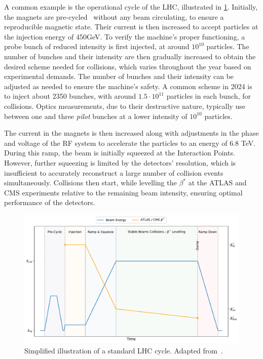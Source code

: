A common example is the operational cycle of the LHC, illustrated in \cref{fig:cern_complex:cycle}.
Initially, the magnets are pre-cycled~\cite{bottura_pre-cycles_2010} without any beam circulating,
to ensure a reproducible magnetic state. Their current is then increased to accept particles at the
injection energy of 450GeV. To verify the machine's proper functioning, a probe bunch of reduced
intensity is first injected, at around $10^{10}$ particles. The number of bunches and their
intensity are then gradually increased to obtain the desired scheme needed for collisions, which
varies throughout the year based on experimental demands. The number of bunches and their intensity
can be adjusted as needed to ensure the machine's safety. A common scheme in 2024 is to inject about
2350 bunches, with around $1.5 \cdot 10^{11}$ particles in each bunch, for collisions. Optics
measurements, due to their destructive nature, typically use between one and three \textit{pilot}
bunches at a lower intensity of $10^{10}$ particles.

The current in the magnets is then increased along with adjustments in the phase and voltage of the
RF system to accelerate the particles to an energy of 6.8 TeV. During this ramp, the beam is
initially squeezed at the Interaction Points. However, further squeezing is limited by the
detectors' resolution, which is insufficient to accurately reconstruct a large number of collision
events simultaneously. Collisions then start, while levelling the $\beta^*$ at the ATLAS and CMS
experiments relative to the remaining beam intensity, ensuring optimal performance of the detectors.

\begin{figure}[!htb]
    \includegraphics[width=\textwidth]{./images/lhc_cycle.pdf}
    \caption{Simplified illustration of a standard LHC cycle. Adapted
    from~\cite{felix_soubelet_local_2023}.}
    \label{fig:cern_complex:cycle}
\end{figure}
